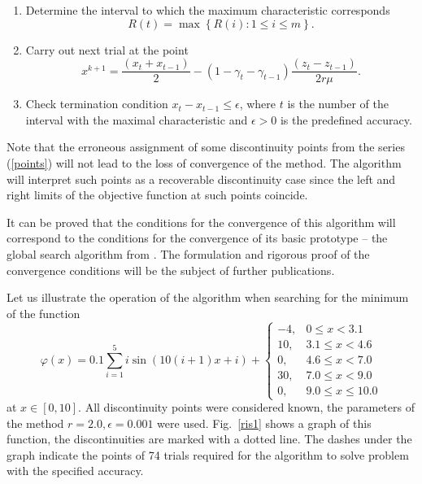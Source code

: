 \documentclass[runningheads]{llncs}
\begin{document}
\begin{enumerate}
\item Determine the interval to which the maximum characteristic corresponds 
\[
R(t)=\max\left\{R(i): 1 \leq i \leq m\right\}.
\]

\item Carry out next trial at the point
\[
x^{k+1}=\frac {(x_t+x_{t-1})}{2}-(1-\gamma_t-\gamma_{t-1} ) \frac{(z_t-z_{t-1})}{2r\mu}.
\]

\item Check termination condition $x_t-x_{t-1} \leq \epsilon$, where $t$ is the number of the interval with the maximal characteristic and $\epsilon > 0$ is the predefined accuracy.

\end{enumerate}

Note that the erroneous assignment of some discontinuity points from the series (\ref{points}) will not lead to the loss of convergence of the method. The algorithm will interpret such points as a recoverable discontinuity case since the left and right limits of the objective function at such points coincide.

It can be proved that the conditions for the convergence of this algorithm will correspond to the conditions for the convergence of its basic prototype -- the global search algorithm from \cite{Strongin2000}. The formulation and rigorous proof of the convergence conditions will be the subject of further publications.

Let us illustrate the operation of the algorithm when searching for the minimum of the function
\begin{equation}\label{testFunction}
\varphi(x) =  0.1\sum_{i=1}^5{i\sin{(10(i+1)x+i)}}+
\begin{cases}
	-4, &0 \leq x < 3.1\\
	10, &3.1 \leq x < 4.6\\
	0, &4.6 \leq x < 7.0\\
	30, &7.0 \leq x < 9.0\\
	0, &9.0 \leq x \leq 10.0
\end{cases}
\end{equation}
at $x\in[0,10]$. All discontinuity points were considered known, the parameters of the method $r=2.0,\epsilon=0.001$ were used. Fig.~\ref{ris1} shows a graph of this function, the discontinuities are marked with a dotted line. The dashes under the graph indicate the points of 74 trials required for the algorithm to solve problem with the specified accuracy.
\end{document}
